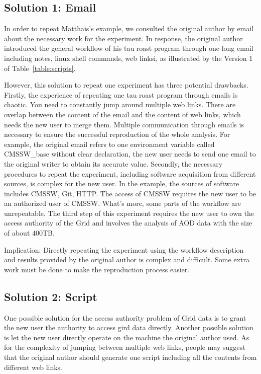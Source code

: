 \documentclass{acm_proc_article-sp}
\begin{document}
\subsection{Solution 1: Email}

In order to repeat Matthais's example, we consulted the original
author by email about the necessary work for the experiment. In response,
the original author introduced the general workflow of his tau roast program through one long
email including notes, linux shell commands, web linksi, as illustrated by the Version 1 of
Table~\ref{table:scripts}.

However, this solution to repeat one experiment has three potential drawbacks.
Firstly, the experience of repeating one tau roast program through emails is
chaotic. You need to constantly jump around multiple web links. There are overlap
between the content of the email and the content of web links, which needs the
new user to merge them. Multiple communication through emails is necessary to
ensure the successful reproduction of the whole analysis. For example, the original
email refers to one environment variable called CMSSW\_base without clear
declaration, the new user needs to send one email to the original writer to
obtain its accurate value. Secondly, the necessary procedures to repeat the
experiment, including software acquisition from different sources, is complex
for the new user. In the example, the sources of software includes
CMSSW, Git, HTTP. The access of CMSSW requires the new user to be an authorized
user of CMSSW. What's more, some parts of the workflow are unrepeatable. The
third step of this experiment requires the new user to own the access authority
of the Grid and involves the analysis of AOD data with the size of about 400TB.

Implication: Directly repeating the experiment using the workflow description and results provided by the original author is complex and difficult. Some extra work must be done to make the reproduction process easier.

\subsection{Solution 2: Script} One possible solution for the access authority
problem of Grid data is to grant the new user the authority to access gird data
directly. Another possible solution is let the new user directly operate on the
machine the original author used. As for the complexity of jumping between
multiple web links, people may suggest that the original author
should generate one script including all the contents from different web links.
\end{document}
